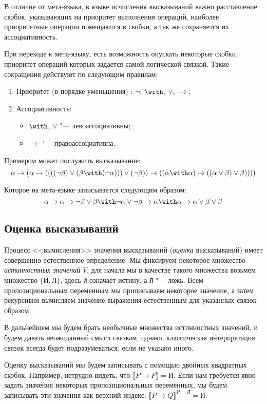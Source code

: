 В отличие от мета-языка, в языке исчисления высказываний важно расставление
скобок, указывающих на приоритет выполнения операций, наиболее приоритетные
операции помещаются в скобки, а так же сохраняется их ассоциативность.

При переходе к мета-языку, есть возможность опускать некоторые скобки, приоритет
операций которых задается самой логической связкой. Такие сокращения действуют по следующим
правилам:
\begin{enumerate}
  \item Приоритет (в порядке уменьшения) : $\neg$, $\with$, $\vee$, $\rightarrow$;
  \item Ассоциативность:
    \begin{itemize}
      \item $\with$, $\vee$ "--- левоассоциативны;
      \item $\rightarrow$ "--- правоассоциативна.
    \end{itemize}
\end{enumerate}
  
Примером может послужить высказывание:
$$\alpha\to(\alpha\to((((\neg\beta)\vee(\beta\with(\neg\alpha)))\vee(\neg\beta))\to((\alpha\with\alpha)\to((\alpha\vee\beta)\vee\beta))))$$
  
Которое на мета-языке записывается следующим образом:
$$\alpha\to\alpha\to\neg\beta\vee\beta\with\neg\alpha\vee\neg\beta\to\alpha\with\alpha\to\alpha\vee\beta\vee\beta$$


\subsection{Оценка высказываний}

Процесс <<вычисления>> значения высказываний (\emph{оценка} высказываний) имеет совершенно
естественное определение. Мы фиксируем некоторое множество
\emph{истинностных значений} $V$, для начала мы в качестве такого множества возьмем 
множество $\{\texttt{И}, \texttt{Л}\}$, здесь \texttt{И} означает истину, а
\texttt{Л} "--- ложь. Всем пропозициональным переменным мы приписываем некоторое
значение, а затем рекурсивно вычисляем значение выражения естественным для указанных
связок образом.

В дальнейшем мы будем брать необычные множества истинностных значений, и будем давать
неожиданный смысл связкам, однако, классическая интерпретация связок всегда будет
подразумеваться, если не указано иного.

Оценку высказываний мы будем записывать с помощью двойных квадратных скобок. Например,
нетрудно видеть, что $\llbracket P \rightarrow P \rrbracket = \texttt{И}$.
Если нам требуется явно задать значения некоторых пропозициональных переменных, мы будем
записывать эти значения как верхний индекс: $\llbracket P \rightarrow Q
\rrbracket ^ {P\coloneqq \texttt{Л}} = \texttt{И}$.

